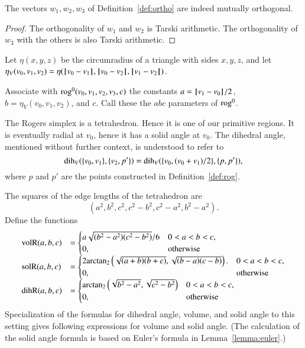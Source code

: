 \begin{lemma} The vectors $w_1,w_2,w_3$ of Definition~\ref{def:ortho}
are indeed mutually orthogonal.
\end{lemma}

\begin{proof} The orthogonality of $w_1$ and $w_2$ is 
Tarski arithmetic. %
The orthogonality of $w_3$ with the others is also Tarski arithmetic. %
\end{proof}

\begin{definition}\label{def:etaV}
Let $\eta(x,y,z)$ be the circumradius of a triangle with sides
$x,y,z$, and let $\eta_V(v_0,v_1,v_2) = \eta({\hskip0.1em|\hskip-0.15em|\hskip0.1em}v_0 - v_1{\hskip0.1em|\hskip-0.15em|\hskip0.1em},{\hskip0.1em|\hskip-0.15em|\hskip0.1em}v_0 - v_2{\hskip0.1em|\hskip-0.15em|\hskip0.1em},{\hskip0.1em|\hskip-0.15em|\hskip0.1em}v_1 - v_2{\hskip0.1em|\hskip-0.15em|\hskip0.1em})$.
\end{definition}

\begin{definition}
Associate with ${\operatorname{rog}}^0(v_0,v_1,v_2,v_3,c)$ the constants
$a={\hskip0.1em|\hskip-0.15em|\hskip0.1em}v_1 - v_0{\hskip0.1em|\hskip-0.15em|\hskip0.1em}/2$, $b=\eta_V(v_0,v_1,v_2)$, and $c$.
Call these the $abc$ parameters of ${\operatorname{rog}}^0$.
\end{definition}

The Rogers simplex is a tetrahedron.  Hence it is one of our
primitive regions.  It is eventually radial at $v_0$, hence
it has a solid angle at $v_0$.  The dihedral
angle, mentioned without further context, is understood to refer to 
   $$
   \operatorname{dih}_V(\{v_0,v_1\},\{v_2,p'\})=\operatorname{dih}_V(\{v_0,(v_0+v_1)/2\},\{p,p'\}),
   $$
where $p$ and $p'$ are the points 
constructed in Definition~\ref{def:rog}.

The squares of the edge lengths of the tetrahedron are
   $$
   (a^2,b^2,c^2,c^2-b^2,c^2-a^2,b^2-a^2).
   $$
Define the functions
   $$
   \begin{array}{lll}
     {\operatorname{volR}}(a,b,c) &= \begin{cases}
       a\sqrt{(b^2-a^2)(c^2-b^2)}/6& 0 < a < b < c,\\
       0,&\text{otherwise}
       \end{cases}\\
     {\operatorname{solR}}(a,b,c) &= \begin{cases}
      2 {\operatorname{arctan_2}}\left(\sqrt{{(a+b)(b+c)}},
         \sqrt{{(b-a) (c-b)}}\right).& 0 < a < b < c,\\
      0,&\text{otherwise}
     \end{cases}\\
     {\operatorname{dihR}}(a,b,c) &= \begin{cases}
      {\operatorname{arctan\ensuremath{_2}}}\left(\sqrt{b^2 - a^2},\sqrt{c^2 - b^2}\right)
      & 0 < a < b < c,\\
      0,&\text{otherwise}
     \end{cases}
     \end{array}
   $$
Specialization of the formulas for dihedral angle, volume, and solid angle to this
setting gives following expressions for volume and solid angle.
(The calculation of the
 solid angle formula is based on Euler's formula in 
Lemma~\ref{lemma:euler}.)

